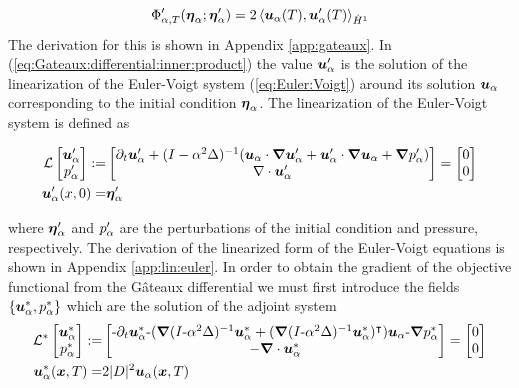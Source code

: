 \begin{equation}\label{eq:Gateaux:differential:inner:product}
\Phi'_{\alpha,T}({\boldsymbol \eta_\alpha};{\boldsymbol \eta'_\alpha}) =  2\left\langle \boldsymbol u_\alpha(T),\boldsymbol u'_\alpha(T)\right\rangle_{\dot{H}^1}
\end{equation}
The derivation for this is shown in Appendix \ref{app:gateaux}. In (\ref{eq:Gateaux:differential:inner:product}) the value $\boldsymbol u'_\alpha$ is the solution of the linearization of the Euler-Voigt system (\ref{eq:Euler:Voigt}) around its solution $\boldsymbol u_\alpha$ corresponding to the initial condition ${\boldsymbol \eta_\alpha}$. The linearization of the Euler-Voigt system is defined as\\
\begin{small}
\begin{subequations}\label{eq:euler:voigt:linearization}
\begin{align}
\mathcal{L}\begin{bmatrix}
\boldsymbol u'_\alpha \\
p'_{\alpha}
\end{bmatrix} :=& 
\begin{bmatrix}
\partial_t \boldsymbol u'_\alpha +(I-\alpha^2\Delta)^{-1}(\boldsymbol u_\alpha\cdot{\boldsymbol \nabla}\boldsymbol u'_\alpha +\boldsymbol u'_\alpha\cdot{\boldsymbol \nabla} \boldsymbol u_\alpha+{\boldsymbol \nabla} p'_{\alpha})\\
      \nabla\cdot \boldsymbol u'_\alpha\\
\end{bmatrix} = \begin{bmatrix}
0\\
0
\end{bmatrix}\\
\boldsymbol u'_\alpha(x,0) =& {\boldsymbol \eta'_\alpha}
\end{align}
\end{subequations}
\end{small}
\noindent where ${\boldsymbol \eta'_\alpha}$ and $p'_{\alpha}$ are the perturbations of the initial condition and pressure, respectively. The derivation of the linearized form of the Euler-Voigt equations is shown in Appendix \ref{app:lin:euler}. In order to obtain the gradient of the objective functional from the G\^{a}teaux differential we must first introduce the fields $\left\lbrace \boldsymbol u^*_\alpha, p^*_{\alpha} \right\rbrace$ which are the solution of the adjoint system
\small
\begin{subequations}\label{eq:euler:voigt:adjoint}
\begin{align}
\mathcal{L}^*\begin{bmatrix}
\boldsymbol u^*_\alpha\\
p^*_{\alpha}
\end{bmatrix} :=& \begin{bmatrix}
\text{-}\partial_t\boldsymbol u^*_\alpha\text{-}({\boldsymbol \nabla} (I\text{-}\alpha^2\Delta)^{-1}\boldsymbol u^*_\alpha + ({\boldsymbol \nabla} (I\text{-}\alpha^2\Delta)^{-1}\boldsymbol u^*_\alpha)^{\intercal})\boldsymbol u_\alpha\text{-}{\boldsymbol \nabla} p^*_{\alpha}\\
-{\boldsymbol \nabla} \cdot \boldsymbol u^*_\alpha
\end{bmatrix} = \begin{bmatrix}
0\\
0
\end{bmatrix}\\
\boldsymbol u^*_\alpha(\boldsymbol x,T) =& 2|D|^2\boldsymbol u_\alpha(\boldsymbol x,T)
\end{align}
\end{subequations}
